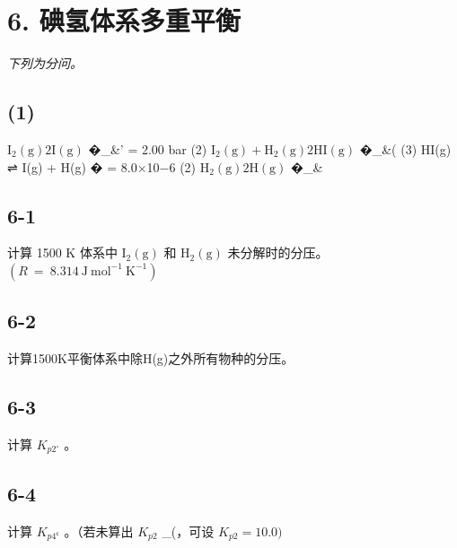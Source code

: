 \section*{6. 碘氢体系多重平衡}
\textit{下列为分问。}

\subsection*{(1)}
$\mathrm { I } _ { 2 } ( \mathrm { g } )  2 \mathrm { I } ( \mathrm { g } )$ �_{&'} = 2.00 bar (2) $\mathrm { I } _ { 2 } ( \mathrm { g } ) + \mathrm { H } _ { 2 } ( \mathrm { g } )  2 \mathrm { H I } ( \mathrm { g } )$ �_{&(} (3) HI(g) ⇌ I(g) + H(g) � = 8.0×10−6 (2) $\mathrm { H } _ { 2 } ( \mathrm { g } )  2 \mathrm { H } ( \mathrm { g } )$ �_{&\*}

\subsection*{6-1}
计算 1500 K 体系中 $\mathrm { I } _ { 2 } ( \mathrm { g } )$ 和 $\mathrm { H } _ { 2 } ( \mathrm { g } )$ 未分解时的分压。 $\left( R \mathrm { ~ = ~ } 8 . 3 1 4 \mathrm { ~ J ~ m o l ^ { - 1 } ~ K ^ { - 1 } } \right)$

\subsection*{6-2}
计算1500K平衡体系中除H(g)之外所有物种的分压。

\subsection*{6-3}
计算 $K _ { p 2 ^ { \circ } }$ 。

\subsection*{6-4}
计算 $K _ { p 4 ^ { \mathsf { c } } }$ 。（若未算出 $K _ { p 2 }$ _{(}，可设 $K _ { p 2 } = 1 0 . 0 )$
